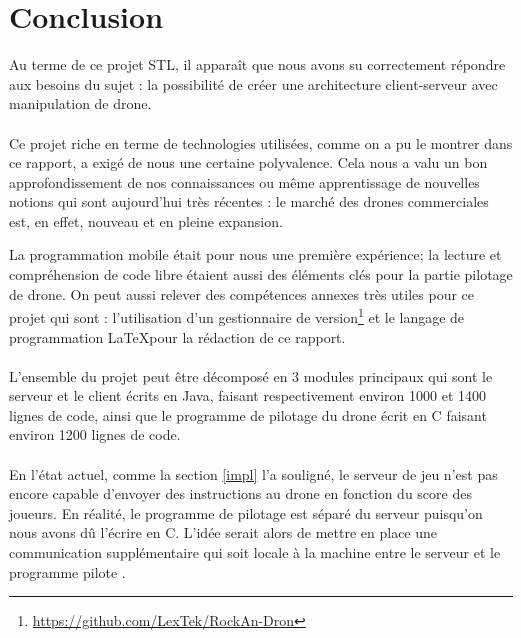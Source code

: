 \newpage
\section{Conclusion}

Au terme de ce projet STL, il apparaît que nous avons su correctement répondre aux besoins du sujet : la possibilité de créer une architecture client-serveur avec manipulation de drone.

\paragraph{}
Ce projet riche en terme de technologies utilisées, comme on a pu le montrer dans ce rapport, a exigé de nous une certaine polyvalence. Cela nous a valu un bon approfondissement de nos connaissances ou même apprentissage de nouvelles notions qui sont aujourd'hui très récentes : le marché des drones commerciales est, en effet, nouveau et en pleine expansion. 

La programmation mobile \android{} était pour nous une première expérience; la lecture et compréhension de code libre étaient aussi des éléments clés pour la partie pilotage de drone. On peut aussi relever des compétences annexes très utiles pour ce projet qui sont : l'utilisation d'un gestionnaire de version\footnote{\url{https://github.com/LexTek/RockAn-Dron}} et le langage de programmation \LaTeX pour la rédaction de ce rapport.

\paragraph{}
L'ensemble du projet peut être décomposé en 3 modules principaux qui sont le serveur et le client écrits en Java, faisant respectivement environ 1000 et 1400 lignes de code, ainsi que le programme de pilotage du drone écrit en C faisant environ 1200 lignes de code.

\paragraph{}
En l'état actuel, comme la section \ref{impl} l'a souligné, le serveur de jeu n'est pas encore capable d'envoyer des instructions au drone en fonction du score des joueurs. En réalité, le programme de pilotage est séparé du serveur puisqu'on nous avons dû l'écrire en C. L'idée serait alors de mettre en place une communication supplémentaire qui soit locale à la machine entre le serveur et le \og programme pilote \fg{}.

